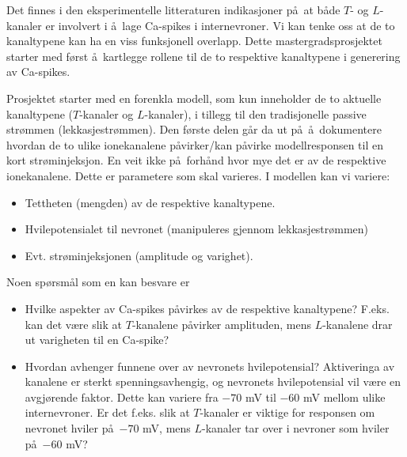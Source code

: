 \documentclass[10pt]{article}
\begin{document}
Det finnes i den eksperimentelle
litteraturen indikasjoner p\aa\ at b\aa de $T$- og $L$-kanaler er involvert i \aa\
lage Ca-spikes i internevroner. Vi kan tenke oss at de to kanaltypene
kan ha en viss funksjonell overlapp. 
Dette mastergradsprosjektet starter med f\o rst \aa\ kartlegge rollene 
til de to respektive kanaltypene
i generering av Ca-spikes.

Prosjektet starter med  en forenkla modell, som kun
inneholder de to aktuelle kanaltypene ($T$-kanaler og $L$-kanaler), i
tillegg til den tradisjonelle passive str\o mmen
(lekkasjestr\o mmen). Den f\o rste delen g\aa r da ut p\aa\ \aa\ dokumentere hvordan de
to ulike ionekanalene p\aa virker/kan p\aa virke modellresponsen til en kort
str\o minjeksjon. En veit ikke 
p\aa\ forh\aa nd hvor mye det er av de respektive ionekanalene. Dette er
parametere som skal varieres.
I modellen kan vi variere:
\begin{itemize}
\item Tettheten (mengden) av de respektive kanaltypene.
\item Hvilepotensialet til nevronet (manipuleres gjennom lekkasjestr\o mmen)
\item Evt. str\o minjeksjonen (amplitude og varighet).
\end{itemize}
Noen spørsm\aa l som en kan besvare er
\begin{itemize}
\item	Hvilke aspekter av Ca-spikes p\aa virkes av de respektive kanaltypene? F.eks. kan det v\ae re slik at $T$-kanalene p\aa virker amplituden, mens $L$-kanalene drar ut varigheten til en Ca-spike?
\item Hvordan avhenger funnene over av nevronets hvilepotensial?
  Aktiveringa av kanalene er sterkt spenningsavhengig, og nevronets
  hvilepotensial vil v\ae re en avgj\o rende faktor. Dette kan variere
  fra $-70$ mV til $-60$ mV mellom ulike internevroner. Er det
  f.eks. slik at $T$-kanaler er viktige for responsen om nevronet hviler
  p\aa\ $-70$ mV, mens $L$-kanaler tar over i nevroner som hviler
  p\aa\ $-60$ mV?
\end{itemize}
\end{document}
